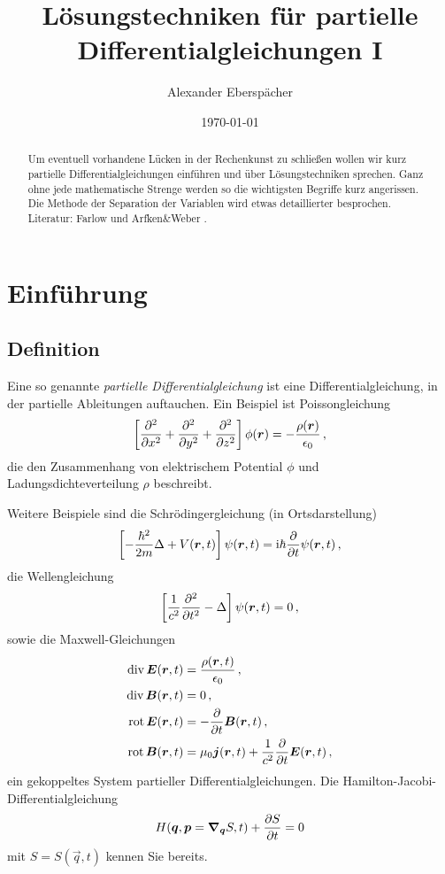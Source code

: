 \documentclass[paper=a4, fontsize=11.0pt, abstractoff, DIV12]{scrartcl}
\title{Lösungstechniken für partielle Differentialgleichungen I}
\author{Alexander Eberspächer}
\date{\today}
\begin{document}
\maketitle
\begin{abstract}
Um eventuell vorhandene Lücken in der Rechenkunst zu schließen wollen wir
kurz partielle Differentialgleichungen einführen und über Lösungstechniken
sprechen. Ganz ohne jede mathematische Strenge werden so die wichtigsten
Begriffe kurz angerissen. Die Methode der Separation der Variablen wird etwas
detaillierter besprochen.\\[0.5ex]
Literatur: Farlow \cite{Farlow} und Arfken\&Weber \cite{Arfken}.
\end{abstract}

\section{Einführung}

\subsection{Definition}

Eine so genannte \emph{partielle Differentialgleichung} ist eine
Differentialgleichung, in der partielle Ableitungen auftauchen. Ein Beispiel ist
Poissongleichung
\begin{equation}
\left[\frac{\partial^2 }{\partial {x}^2} + \frac{\partial^2 }{\partial {y}^2} + \frac{\partial^2 }{\partial {z}^2}\right] \phi({\boldsymbol{r}}) = -\frac{\rho({\boldsymbol{r}})}{\epsilon_0}\, ,
\label{eq:Poisson}
\end{equation}
die den Zusammenhang von elektrischem Potential $\phi$ und Ladungsdichteverteilung
$\rho$ beschreibt.

Weitere Beispiele sind die Schrödingergleichung (in Ortsdarstellung)
\begin{equation}
\left[-\frac{\hbar^2}{2m} \Delta + V({\boldsymbol{r}}, t)\right]\psi({\boldsymbol{r}}, t) = \mathrm{i} \hbar\frac{\partial }{\partial t}\psi({\boldsymbol{r}}, t)\,,
\label{eq:SGL}
\end{equation}
die Wellengleichung
\begin{equation}
\left[\frac{1}{c^2}\frac{\partial^2 }{\partial {t}^2} - \Delta\right]\psi({\boldsymbol{r}}, t) = 0\,,
\end{equation}
sowie die Maxwell-Gleichungen
\begin{align}
\operatorname{div} {\boldsymbol{E}}({\boldsymbol{r}}, t) &= \frac{\rho({\boldsymbol{r}}, t)}{\epsilon_0}\,,\\
\operatorname{div} {\boldsymbol{B}}({\boldsymbol{r}}, t) &= 0\,,\\
\operatorname{rot} {\boldsymbol{E}}({\boldsymbol{r}}, t) &= -\frac{\partial }{\partial t}{\boldsymbol{B}}({\boldsymbol{r}}, t)\,,\\
\operatorname{rot} {\boldsymbol{B}}({\boldsymbol{r}}, t) &= \mu_0 {\boldsymbol{j}}({\boldsymbol{r}}, t) + \frac{1}{c^2}\frac{\partial }{\partial t}{\boldsymbol{E}}({\boldsymbol{r}}, t)\,,
\end{align}
ein gekoppeltes System partieller Differentialgleichungen. Die
Hamilton-Jacobi-Differentialgleichung
\begin{equation}
H(\vec q, \vec p=\nabla_{\vec q} S, t) + \firstpderiv{S}{t} = 0
\label{eq:HJ}
\end{equation}
mit $S=S(\vec q, t)$ kennen Sie bereits.
\end{document}
